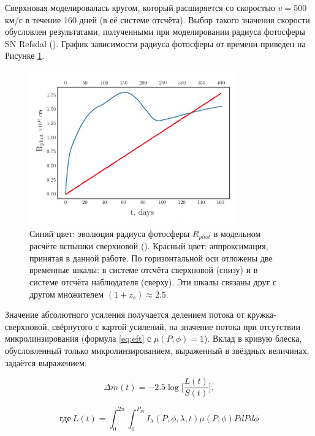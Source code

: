Сверхновая моделировалась кругом, который расширяется со скоростью $v=500$ км/с в течение 160 дней (в её системе отсчёта). Выбор такого значения скорости обусловлен результатами, полученными при моделировании радиуса фотосферы SN Refsdal (\cite{petrnat2020}). График зависимости радиуса фотосферы от времени приведен на Рисунке \ref{fig:snexpand}.

\begin{figure}[H]
    \centering
	\includegraphics[width=0.8\textwidth]{microlensing/images/snexpand.png}
	\caption{Синий цвет: эволюция радиуса фотосферы $R_{phot}$ в модельном расчёте вспышки сверхновой (\cite{petrnat2020}). Красный цвет: аппроксимация, принятая в данной работе. По горизонтальной оси отложены две временные шкалы: в системе отсчёта сверхновой (снизу) и в системе отсчёта наблюдателя (сверху). Эти шкалы связаны друг с другом множителем $(1+z_{s})\approx 2.5$.}
	\label{fig:snexpand}
\end{figure}

\newpage

Значение абсолютного усиления получается делением потока от кружка-сверхновой, свёрнутого с картой усилений, на значение потока при отсутствии микролинзирования (формула \ref{eq:eft} с $\mu(P,\phi)=1$). Вклад в кривую блеска, обусловленный только микролинзированием, выраженный в звёздных величинах, задаётся выражением:

\begin{equation}\label{eq:deltam}
\Delta m (t)= - 2.5\log \Big[ \frac{L(t)}{S(t)} \Big],
\end{equation}

\begin{equation}\label{eq:iott}
\textrm{где} \ L(t) = \int_0^{2\pi} \int_0^{P_m} I_{\lambda}(P,\phi,\lambda, t) \mu(P,\phi)P dP d\phi
\end{equation}

